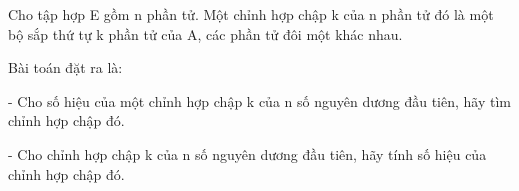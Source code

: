 Cho tập hợp E gồm n phần tử. Một chỉnh hợp chập k  của n phần tử đó là một bộ sắp thứ tự k phần tử của A, các phần tử đôi một khác nhau.  

   Bài toán đặt ra là:  

   - Cho số hiệu của một chỉnh hợp chập k của n số nguyên dương đầu tiên, hãy tìm chỉnh hợp chập đó.  

   - Cho chỉnh hợp chập k của n số nguyên dương đầu tiên, hãy tính số hiệu của chỉnh hợp chập đó.